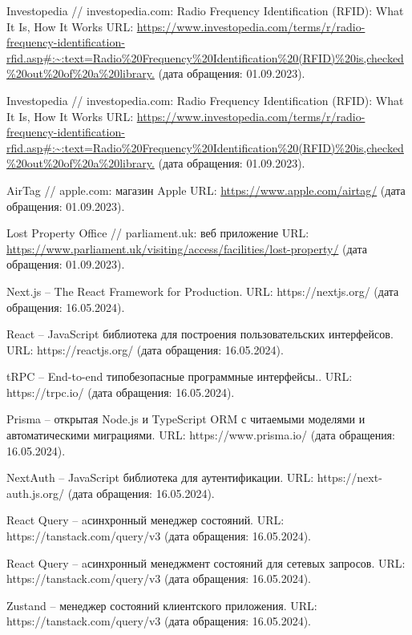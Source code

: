 \documentclass{mirea}
\begin{document}
\begin{thebibliography}{99\kern\bibindent}
	 Investopedia // investopedia.com: Radio Frequency Identification (RFID): What It Is, How It Works URL: \url{https://www.investopedia.com/terms/r/radio-frequency-identification-rfid.asp#:~:text=Radio%20Frequency%20Identification%20(RFID)%20is,checked%20out%20of%20a%20library.} (дата обращения: 01.09.2023).
	
	 Investopedia // investopedia.com: Radio Frequency Identification (RFID): What It Is, How It Works URL: \url{https://www.investopedia.com/terms/r/radio-frequency-identification-rfid.asp#:~:text=Radio%20Frequency%20Identification%20(RFID)%20is,checked%20out%20of%20a%20library.} (дата обращения: 01.09.2023).
	
	 AirTag // apple.com: магазин Apple URL: \url{https://www.apple.com/airtag/} (дата обращения: 01.09.2023).
	
	 Lost Property Office // parliament.uk: веб приложение URL: \url{https://www.parliament.uk/visiting/access/facilities/lost-property/} (дата обращения: 01.09.2023).
	
	 Next.js – The React Framework for Production. URL: https://nextjs.org/ (дата обращения: 16.05.2024).
	
	 React – JavaScript библиотека для построения пользовательских интерфейсов. URL: https://reactjs.org/ (дата обращения: 16.05.2024).
	
	 tRPC – End-to-end типобезопасные программные интерфейсы.. URL: https://trpc.io/ (дата обращения: 16.05.2024).
	
	 Prisma – открытая Node.js и TypeScript ORM с читаемыми моделями и автоматическими миграциями. URL: https://www.prisma.io/ (дата обращения: 16.05.2024).
	
	 NextAuth – JavaScript библиотека для аутентификации. URL: https://next-auth.js.org/ (дата обращения: 16.05.2024).
	
	 React Query – aсинхронный менеджер состояний. URL: https://tanstack.com/query/v3 (дата обращения: 16.05.2024).
	
	 React Query – aсинхронный менеджмент состояний для сетевых запросов. URL: https://tanstack.com/query/v3 (дата обращения: 16.05.2024).
	
	 Zustand – менеджер состояний клиентского приложения. URL: https://tanstack.com/query/v3 (дата обращения: 16.05.2024).
	

\end{thebibliography}
\end{document}
